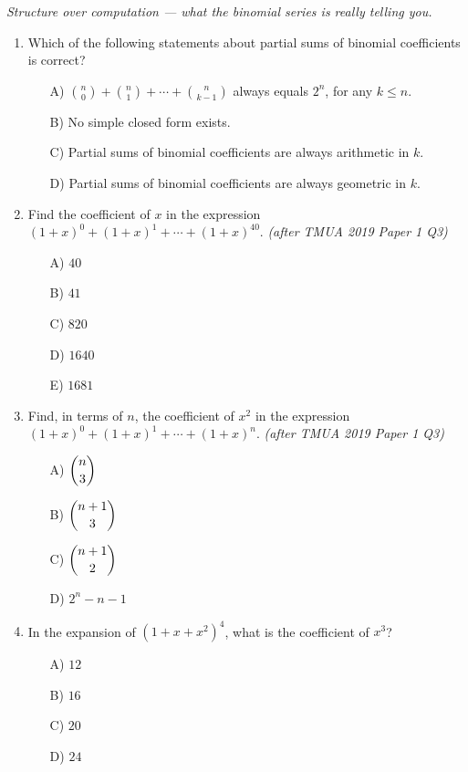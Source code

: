 \documentclass[11pt,a4paper]{article}
\begin{document}
\noindent\textit{Structure over computation --- what the binomial series is really telling you.}

\begin{enumerate}

\item Which of the following statements about partial sums of binomial coefficients is correct?
\begin{itemize}
\item[A)] $\binom n0+\binom n1+\cdots+\binom n{k-1}$ always equals $2^n$, for any $k\leq n$.
\item[B)] No simple closed form exists.
\item[C)] Partial sums of binomial coefficients are always arithmetic in $k$.
\item[D)] Partial sums of binomial coefficients are always geometric in $k$.
\end{itemize}

\item Find the coefficient of $x$ in the expression $(1+x)^0+(1+x)^1+\cdots+(1+x)^{40}$. \textit{\small(after TMUA 2019 Paper 1 Q3)}
\begin{itemize}
\item[A)] $40$
\item[B)] $41$
\item[C)] $820$
\item[D)] $1640$
\item[E)] $1681$
\end{itemize}

\item Find, in terms of $n$, the coefficient of $x^2$ in the expression $(1+x)^0+(1+x)^1+\cdots+(1+x)^n$. \textit{\small(after TMUA 2019 Paper 1 Q3)}
\begin{itemize}
\item[A)] $\dbinom n3$
\item[B)] $\dbinom{n+1}3$
\item[C)] $\dbinom{n+1}2$
\item[D)] $2^n-n-1$
\end{itemize}

\item In the expansion of $(1+x+x^2)^4$, what is the coefficient of $x^3$?
\begin{itemize}
\item[A)] $12$
\item[B)] $16$
\item[C)] $20$
\item[D)] $24$
\end{itemize}


\end{enumerate}
\end{document}
